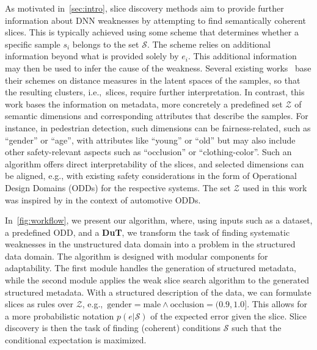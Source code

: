 As motivated in~\cref{sec:intro}, slice discovery methods aim to provide further information about DNN weaknesses by attempting to find semantically coherent slices.
This is typically achieved using some scheme that determines whether a specific sample $s_i$ belongs to the set $\mathcal S$. The scheme relies on additional information beyond what is provided solely by $e_i$.
This additional information may then be used to infer the cause of the weakness.
Several existing works~\citep{d2022spotlight, eyuboglu2022domino, jain2023distilling} base their schemes on distance measures in the latent spaces of the samples, so that the resulting clusters, i.e.,\ slices, require further interpretation.
In contrast, this work bases the information on metadata, more concretely a predefined set $\mathcal Z$ of semantic dimensions and corresponding attributes that describe the samples. For instance, in pedestrian detection, such dimensions can be fairness-related, such as ``gender'' or ``age'', with attributes like ``young'' or ``old'' but may also include other safety-relevant aspects such as ``occlusion'' or ``clothing-color''.
Such an algorithm offers direct interpretability of the slices, and selected dimensions can be aligned, e.g., with existing safety considerations in the form of Operational Design Domains (ODDs) for the respective systems. The set $\mathcal Z$ used in this work was inspired by \citet{herrmann2022using} in the context of automotive ODDs.




In~\cref{fig:workflow}, we present our algorithm, where, using inputs such as a dataset, a predefined ODD, and a \textbf{DuT}, we transform the task of finding systematic weaknesses in the unstructured data domain into a problem in the structured data domain. The algorithm is designed with modular components for adaptability. The first module handles the generation of structured metadata, while the second module applies the weak slice search algorithm to the generated structured metadata. With a structured description of the data, we can formulate slices as rules over $\mathcal Z$, e.g.,\ $\text{gender} = \text{male}\wedge \text{occlusion} = (0.9, 1.0]$. This allows for a more probabilistic notation $p(e|\mathcal{S})$ of the expected error given the slice. Slice discovery is then the task of finding (coherent) conditions $\mathcal S$ such that the conditional expectation is maximized.


